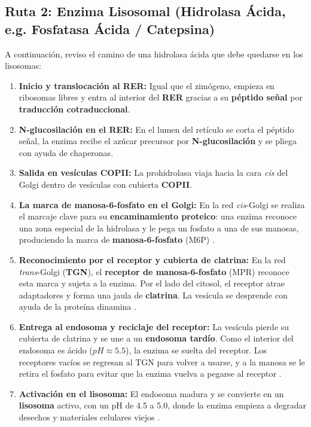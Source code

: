 \documentclass[spanish,letterpaper,oneside]{article}
\begin{document}
\subsection{Ruta 2: Enzima Lisosomal (Hidrolasa Ácida, e.g. Fosfatasa Ácida / Catepsina)}
A continuación, reviso el camino de una hidrolasa ácida que debe quedarse en los lisosomas:
\begin{enumerate}
    \item \textbf{Inicio y translocación al RER:} Igual que el zimógeno, empieza en ribosomas libres y entra al interior del \textbf{RER} gracias a su \textbf{péptido señal} por \textbf{traducción cotraduccional}.
    \item \textbf{N-glucosilación en el RER:} En el lumen del retículo se corta el péptido señal, la enzima recibe el azúcar precursor por \textbf{N-glucosilación} y se pliega con ayuda de chaperonas.
    \item \textbf{Salida en vesículas COPII:} La prohidrolasa viaja hacia la cara \textit{cis} del Golgi dentro de vesículas con cubierta \textbf{COPII}.
    \item \textbf{La marca de manosa-6-fosfato en el Golgi:} En la red \textit{cis}-Golgi se realiza el marcaje clave para su \textbf{encaminamiento proteico}: una enzima reconoce una zona especial de la hidrolasa y le pega un fosfato a una de sus manosas, produciendo la marca de \textbf{manosa-6-fosfato} (M6P) \parencite{mathews2013bioquimica, alberts2022molecular}.
    \item \textbf{Reconocimiento por el receptor y cubierta de clatrina:} En la red \textit{trans}-Golgi (\textbf{TGN}), el \textbf{receptor de manosa-6-fosfato} (MPR) reconoce esta marca y sujeta a la enzima. Por el lado del citosol, el receptor atrae adaptadores y forma una jaula de \textbf{clatrina}. La vesícula se desprende con ayuda de la proteína dinamina \parencite{lodish2021molecular, fortoul2020histologia}.
    \item \textbf{Entrega al endosoma y reciclaje del receptor:} La vesícula pierde su cubierta de clatrina y se une a un \textbf{endosoma tardío}. Como el interior del endosoma es ácido ($pH \approx 5.5$), la enzima se suelta del receptor. Los receptores vacíos se regresan al TGN para volver a usarse, y a la manosa se le retira el fosfato para evitar que la enzima vuelva a pegarse al receptor \parencite{alberts2022molecular, kierszenbaum2020histologia}.
    \item \textbf{Activación en el lisosoma:} El endosoma madura y se convierte en un \textbf{lisosoma} activo, con un pH de 4.5 a 5.0, donde la enzima empieza a degradar desechos y materiales celulares viejos \parencite{fortoul2020histologia, lieberman2018marks}.
\end{enumerate}
\end{document}
